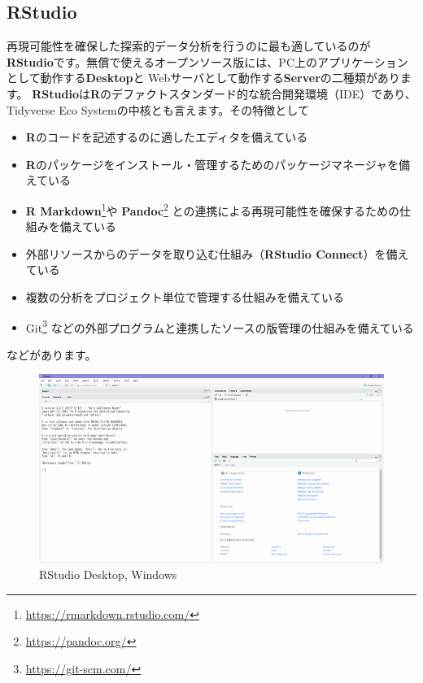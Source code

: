 \documentclass[
  12pt,
]{book}
\DeclareRobustCommand{\href}[2]{#2\footnote{\url{#1}}}
\providecommand{\tightlist}{%
  \setlength{\itemsep}{0pt}\setlength{\parskip}{0pt}}
\begin{document}
\hypertarget{rstudio}{%
\subsection{RStudio}\label{rstudio}}

再現可能性を確保した探索的データ分析を行うのに最も適しているのが\textbf{RStudio}です。無償で使えるオープンソース版には、PC上のアプリケーションとして動作する\textbf{Desktop}と Webサーバとして動作する\textbf{Server}の二種類があります。 \textbf{RStudio}は\textbf{R}のデファクトスタンダード的な統合開発環境（IDE）であり、Tidyverse Eco Systemの中核とも言えます。その特徴として

\begin{itemize}
\tightlist
\item
  \textbf{R}のコードを記述するのに適したエディタを備えている
\item
  \textbf{R}のパッケージをインストール・管理するためのパッケージマネージャを備えている
\item
  \href{https://rmarkdown.rstudio.com/}{\textbf{R Markdown}}や \href{https://pandoc.org/}{\textbf{Pandoc}} との連携による再現可能性を確保するための仕組みを備えている
\item
  外部リソースからのデータを取り込む仕組み（\textbf{RStudio Connect}）を備えている
\item
  複数の分析をプロジェクト単位で管理する仕組みを備えている
\item
  \href{https://git-scm.com/}{Git} などの外部プログラムと連携したソースの版管理の仕組みを備えている
\end{itemize}

などがあります。

\begin{figure}[H]

{\centering \includegraphics[width=0.9\linewidth,]{./fig/RStudio/DT} 

}

\caption{RStudio Desktop, Windows}\label{fig:unnamed-chunk-15}
\end{figure}
\end{document}
